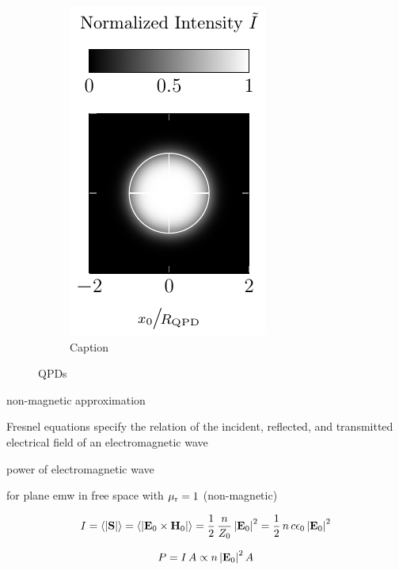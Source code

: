 \begin{figure}
\begin{subfigure}[b]{0.3\textwidth}
    \label{fig:Th-QPDy}
  \end{subfigure}
  \hfill
  \begin{subfigure}[b]{0.3\textwidth}
    \centering
    \includegraphics[]{Plots/cache/QPDt.pdf}
    \caption{Caption}
    \label{fig:Th-QPDt}
  \end{subfigure}
  \caption{QPDs}
  \label{fig:QPDs}
\end{figure}

\lipsum[1-2]

non-magnetic approximation

Fresnel equations specify the relation of the incident, reflected, and 
transmitted electrical field of an electromagnetic wave



power of electromagnetic wave

\cite[Chapter 7]{Jackson2013}


for plane emw in free space with $\mu_{\mathrm{r}} = 1$ (non-magnetic)

\begin{equation}
  I = \left\langle \abs{\vb{S}} \right\rangle = 
  \left\langle \abs{\vb{E}_{0}\times\vb{H}_{0}} \right\rangle = 
  \frac{1}{2}\,\frac{n}{Z_{0}}\,\abs{\vb{E}_{0}}^{2} = 
  \frac{1}{2}\,n\,c\epsilon_{0}\,\abs{\vb{E}_{0}}^{2}
\end{equation}

\begin{equation}
  P = I\,A \propto n\,\abs{\vb{E}_{0}}^{2}\,A
\end{equation}

